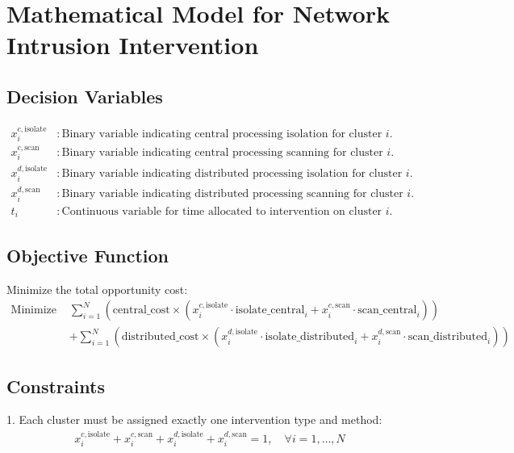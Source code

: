 \documentclass{article}
\begin{document}
\section*{Mathematical Model for Network Intrusion Intervention}

\subsection*{Decision Variables}
\begin{align*}
    x_{i}^{c, \text{isolate}} & : \text{Binary variable indicating central processing isolation for cluster } i. \\
    x_{i}^{c, \text{scan}} & : \text{Binary variable indicating central processing scanning for cluster } i. \\
    x_{i}^{d, \text{isolate}} & : \text{Binary variable indicating distributed processing isolation for cluster } i. \\
    x_{i}^{d, \text{scan}} & : \text{Binary variable indicating distributed processing scanning for cluster } i. \\
    t_{i} & : \text{Continuous variable for time allocated to intervention on cluster } i.
\end{align*}

\subsection*{Objective Function}
Minimize the total opportunity cost:
\begin{align*}
    \text{Minimize } & \sum_{i=1}^{N} \left( \text{central\_cost} \times \left( x_{i}^{c, \text{isolate}} \cdot \text{isolate\_central}_{i} + x_{i}^{c, \text{scan}} \cdot \text{scan\_central}_{i} \right) \right) \\
    & + \sum_{i=1}^{N} \left( \text{distributed\_cost} \times \left( x_{i}^{d, \text{isolate}} \cdot \text{isolate\_distributed}_{i} + x_{i}^{d, \text{scan}} \cdot \text{scan\_distributed}_{i} \right) \right)
\end{align*}

\subsection*{Constraints}

1. Each cluster must be assigned exactly one intervention type and method:
\begin{align*}
    x_{i}^{c, \text{isolate}} + x_{i}^{c, \text{scan}} + x_{i}^{d, \text{isolate}} + x_{i}^{d, \text{scan}} = 1, \quad \forall i = 1, \ldots, N
\end{align*}
\end{document}
